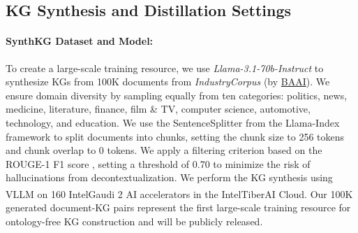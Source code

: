 \documentclass{article} %
\begin{document}
\subsection{KG Synthesis and Distillation Settings}\label{sec:synthKG}
\paragraph{SynthKG Dataset and Model:}
To create a large-scale training resource, we use \textit{Llama-3.1-70b-Instruct} \citep{llama3modelcard} to synthesize KGs from 100K documents from \textit{IndustryCorpus} (by \href{https://huggingface.co/datasets/BAAI/IndustryCorpus}{BAAI}). We ensure domain diversity by sampling equally from ten categories: politics, news, medicine, literature, finance, film \& TV, computer science, automotive, technology, and education. 
We use the SentenceSplitter from the Llama-Index \citep{Liu_LlamaIndex_2022} framework to split documents into chunks, setting the chunk size to 256 tokens and chunk overlap to 0 tokens. 
We apply a filtering criterion based on the ROUGE-1 F1 score \citep{lin-2004-rouge}, setting a threshold of 0.70 to minimize the risk of hallucinations from decontextualization.
We perform the KG synthesis using VLLM \citep{kwon2023efficient} on 160 Intel\textsuperscript{\textregistered}\space Gaudi 2 AI accelerators in the Intel\textsuperscript{\textregistered}\space Tiber\textsuperscript{\texttrademark}\space AI Cloud.
Our 100K generated document-KG pairs represent the first large-scale training resource for ontology-free KG construction and will be publicly released.


\end{document}
